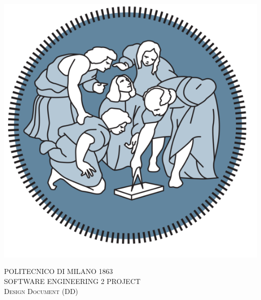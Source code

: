 



\begin{titlepage} %
	\newcommand{\HRule}{\rule{\linewidth}{0.5mm}} %

	\center %

	\begin{center} \includegraphics[scale=0.5]{Images/PolimiLogo1} \end{center}
	\textsc{\LARGE POLITECNICO DI MILANO 1863}\\[2cm]

	\textsc{\Large SOFTWARE ENGINEERING 2 PROJECT }\\[0.5cm]

	\textsc{\large Design Document (DD)}\\[0.5cm]



\end{titlepage}
